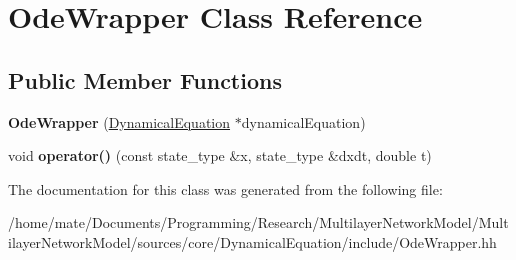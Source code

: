 \hypertarget{classOdeWrapper}{}\section{Ode\+Wrapper Class Reference}
\label{classOdeWrapper}
\subsection*{Public Member Functions}
\begin{DoxyCompactItemize}
\item 
{\bfseries Ode\+Wrapper} (\hyperlink{classDynamicalEquation}{Dynamical\+Equation} $\ast$dynamical\+Equation)\hypertarget{classOdeWrapper_aa8040393c4c88a9ab4dd8e635bbf5013}{}\label{classOdeWrapper_aa8040393c4c88a9ab4dd8e635bbf5013}

\item 
void {\bfseries operator()} (const state\+\_\+type \&x, state\+\_\+type \&dxdt, double t)\hypertarget{classOdeWrapper_a33b79d119cfe08c509865c30fb9b0d22}{}\label{classOdeWrapper_a33b79d119cfe08c509865c30fb9b0d22}

\end{DoxyCompactItemize}


The documentation for this class was generated from the following file\+:\begin{DoxyCompactItemize}
\item 
/home/mate/\+Documents/\+Programming/\+Research/\+Multilayer\+Network\+Model/\+Multilayer\+Network\+Model/sources/core/\+Dynamical\+Equation/include/Ode\+Wrapper.\+hh\end{DoxyCompactItemize}
